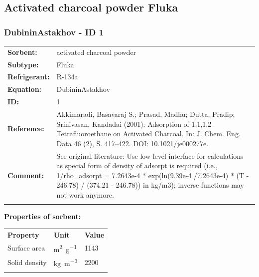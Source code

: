 \subsection{Activated charcoal powder Fluka}
%
\subsubsection{DubininAstakhov - ID 1}
%
\begin{tabular}[l]{|lp{11.5cm}|}
\hline
\addlinespace

\textbf{Sorbent:} & activated charcoal powder \\
\textbf{Subtype:} & Fluka \\
\textbf{Refrigerant:} & R-134a \\
\textbf{Equation:} & DubininAstakhov \\
\textbf{ID:} & 1 \\
\textbf{Reference:} & Akkimaradi, Basavaraj S.; Prasad, Madhu; Dutta, Pradip; Srinivasan, Kandadai (2001): Adsorption of 1,1,1,2-Tetrafluoroethane on Activated Charcoal. In: J. Chem. Eng. Data 46 (2), S. 417–422. DOI: 10.1021/je000277e. \\
\textbf{Comment:} & See original literature: Use low-level interface for calculations as special form of density of adsorpt is required (i.e., 1/rho\_adsorpt = 7.2643e-4 * exp(ln(9.39e-4 /7.2643e-4) * (T - 246.78) / (374.21 - 246.78)) in kg/m3); inverse functions may not work anymore. \\

\addlinespace
\hline
\end{tabular}
\newline

\textbf{Properties of sorbent:}
\newline
%
\begin{longtable}[l]{lll}
\toprule
\addlinespace
\textbf{Property} & \textbf{Unit} & \textbf{Value} \\
\addlinespace
\midrule
\endhead
\bottomrule
\endfoot
\bottomrule
\endlastfoot
\addlinespace

Surface area & \si{\square\meter\per\gram} & 1143\\
Solid density & \si{\kilogram\per\cubic\meter} & 2200\\

\addlinespace\end{longtable}


